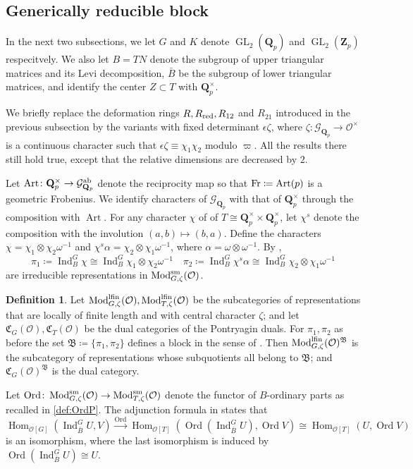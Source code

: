 \documentclass[leqno]{amsart}
\newcommand{\lfMod}{\textnormal{Mod}^{\textnormal{lfin}}}
\DeclareMathOperator{\Mod}{\textnormal{Mod}}
\newcommand{\B}{\mathfrak B}
\newcommand{\fC}{\mathfrak C}
\newcommand{\Gp}{\mathcal{G}_{\Qp}} %
\newcommand{\Fr}{\textnormal{Fr}} %
\DeclareMathOperator{\Ord}{Ord}
\DeclareMathOperator{\Art}{Art}
\newcommand{\sm}{\textnormal{sm}}
\newcommand{\red}{\textnormal{red}}
\DeclareMathOperator{\GL}{GL}
\newcommand{\Qp}{\mathbf{Q}_p}
\newcommand{\Zp}{\mathbf{Z}_p}
\newcommand{\oo}{\mathcal{O}} %
\DeclareMathOperator{\Hom}{Hom}
\DeclareMathOperator{\Ind}{Ind}
\theoremstyle{definition}
\newtheorem{defn}[thm]{Definition}
\theoremstyle{remark}
\begin{document}
\subsection{Generically reducible block}

In the next two subsections,
we let $G$ and  $K$
denote  $\GL_2(\Qp)$ and $\GL_2(\Zp)$
respecitvely.
We also let $B=TN$
denote the subgroup of upper triangular matrices
and its Levi decomposition,
$\bar{B}$ be
the subgroup of lower triangular matrices,
and identify the center $Z\subset T$ with $\Qp^\times$.

We briefly replace the deformation rings
$R, R_{\red}, R_{12}$ and $R_{21}$
introduced in the previous subsection
by the variants with 
fixed determinant $\epsilon\zeta$,
where $\zeta\colon \Gp\to \oo^\times$
is a continuous character 
such that  $\epsilon\zeta\equiv \chi_1\chi_2$ 
modulo $\varpi$.
All the results there
still hold true, 
except that the relative dimensions
are decreased by  $2$.

Let $\Art\colon \Qp^\times\to \Gp^{\textnormal{ab}}$
denote the reciprocity map
so that $\Fr\coloneqq \Art(p)$
is a geometric Frobenius.
We identify characters
of $\Gp$ with that of $\Qp^\times$
through the composition with $\Art$.
For any character $\chi$ of 
of $T\cong \Qp^\times\times\Qp^\times$,
let $\chi^s$
denote the composition
with the involution
$(a,b)\mapsto (b,a)$.
Define the characters
$\chi=\chi_1\otimes\chi_2\omega^{-1}$ and
$\chi^s\alpha=\chi_2\otimes \chi_1\omega^{-1}$,
where  $\alpha=\omega\otimes\omega^{-1}$.
By \cite[Thm 30]{barthel},
\[
\pi_1\coloneqq \Ind_{B}^G\chi\cong
\Ind_{B}^G\chi_1\otimes\chi_2\omega^{-1}\quad
\pi_2\coloneqq \Ind_{B}^G\chi^s\alpha\cong 
\Ind_{B}^G\chi_2\otimes\chi_1\omega^{-1} 
\]
are irreducible representations
in $\Mod^{\sm}_{G,\zeta}(\oo)$.

\begin{defn}\label{def:block}
Let $\lfMod_{G,\zeta}(\oo), \lfMod_{T,\zeta}(\oo)$
be the subcategories
of representations that are 
locally of finite length 
and with central character $\zeta$;
and let $\fC_G(\oo), \fC_T(\oo)$
be the dual categories
of the Pontryagin duals.
For $\pi_1,\pi_2$ as before
the set $\B\coloneqq\{\pi_1,\pi_2\}$ 
defines a block 
in the sense of \cite[\S 5]{pask}.
Then $\lfMod_{G,\zeta}(\oo)^\B$
is the subcategory
of representations whose subquotients
all belong to $\B$;
and $\fC_G(\oo)^\B$
is the dual category.
\end{defn}

Let $\Ord\colon \Mod_{G,\zeta}^{\sm}(\oo)
\to \Mod_{T,\zeta}^{\sm}(\oo)$
denote the functor of $B$-ordinary
parts as recalled in \eqref{def:OrdP}.
The adjunction formula
in \cite[Thm 4.4.6]{emeI} states that
\begin{equation}\label{eq:adjunct}
	\Hom_{\oo[G]}(\Ind_{\bar{B}}^GU,V)
	\xrightarrow{\Ord}
	\Hom_{\oo[T]}(\Ord(\Ind_{\bar{B}}^GU),\Ord V)
	\cong
	\Hom_{\oo[T]}(U,\Ord V)
\end{equation}
is an isomorphism, where the last isomorphism
is induced by $\Ord(\Ind_{\bar{B}}^GU)\cong U$.
\end{document}
